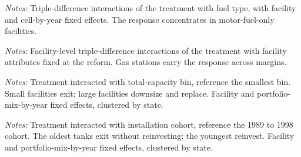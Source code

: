 \documentclass[
  12pt,
]{article}
\begin{document}
\clearpage
\null\vfill
\begin{center}
\label{tbl-hte-tank}
\vspace{6pt}
\par\vspace{10pt}
\begin{minipage}{0.85\textwidth}\small\textit{Notes:} Triple-difference interactions of the treatment with fuel type, with facility and cell-by-year fixed effects. The response concentrates in motor-fuel-only facilities.\end{minipage}
\end{center}
\vfill\clearpage

\clearpage
\null\vfill
\begin{center}
\label{tbl-fac-hte}
\vspace{6pt}
\par\vspace{10pt}
\begin{minipage}{0.85\textwidth}\small\textit{Notes:} Facility-level triple-difference interactions of the treatment with facility attributes fixed at the reform. Gas stations carry the response across margins.\end{minipage}
\end{center}
\vfill\clearpage

\clearpage
\null\vfill
\begin{center}
\label{tbl-size-hte}
\vspace{6pt}
\par\vspace{10pt}
\begin{minipage}{0.85\textwidth}\small\textit{Notes:} Treatment interacted with total-capacity bin, reference the smallest bin. Small facilities exit; large facilities downsize and replace. Facility and portfolio-mix-by-year fixed effects, clustered by state.\end{minipage}
\end{center}
\vfill\clearpage

\clearpage
\null\vfill
\begin{center}
\label{tbl-vintage-hte}
\vspace{6pt}
\par\vspace{10pt}
\begin{minipage}{0.85\textwidth}\small\textit{Notes:} Treatment interacted with installation cohort, reference the 1989 to 1998 cohort. The oldest tanks exit without reinvesting; the youngest reinvest. Facility and portfolio-mix-by-year fixed effects, clustered by state.\end{minipage}
\end{center}
\vfill\clearpage
\end{document}
